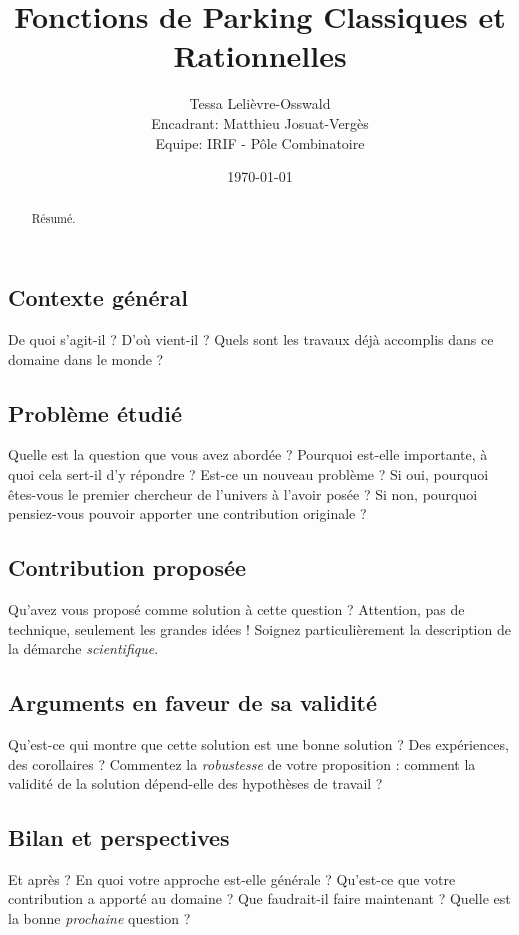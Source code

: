 \documentclass[11pt]{article}
\begin{document}
\title{Fonctions de Parking Classiques et Rationnelles}
\author{Tessa Lelièvre-Osswald\\
    {\small Encadrant: Matthieu Josuat-Vergès}\\
    {\small Equipe: IRIF - Pôle Combinatoire}}
\date{\today}

\maketitle

\subsection*{Contexte général}

De quoi s'agit-il ? 
D'où vient-il ? 
Quels sont les travaux déjà accomplis dans ce domaine dans le monde ?

\subsection*{Problème étudié}

Quelle est la question que vous avez abordée ? 
Pourquoi est-elle importante, à quoi cela sert-il d'y répondre ?  
Est-ce un nouveau problème ?
Si oui, pourquoi êtes-vous le premier chercheur de l'univers à l'avoir posée ?
Si non, pourquoi pensiez-vous pouvoir apporter une contribution originale ?

\subsection*{Contribution proposée}

Qu'avez vous proposé comme solution à cette question ? 
Attention, pas de technique, seulement les grandes idées ! 
Soignez particulièrement la description de la démarche \emph{scientifique}.

\subsection*{Arguments en faveur de sa validité}

Qu'est-ce qui montre que cette solution est une bonne solution ?
Des expériences, des corollaires ? 
Commentez la \emph{robustesse} de votre proposition : 
comment la validité de la solution dépend-elle des hypothèses de travail ?

\subsection*{Bilan et perspectives}

Et après ? En quoi votre approche est-elle générale ? 
Qu'est-ce que votre contribution a apporté au domaine ? 
Que faudrait-il faire maintenant ? 
Quelle est la bonne \emph{prochaine} question ?


\begin{abstract}
   Résumé.
\end{abstract}

\tableofcontents
\end{document}
